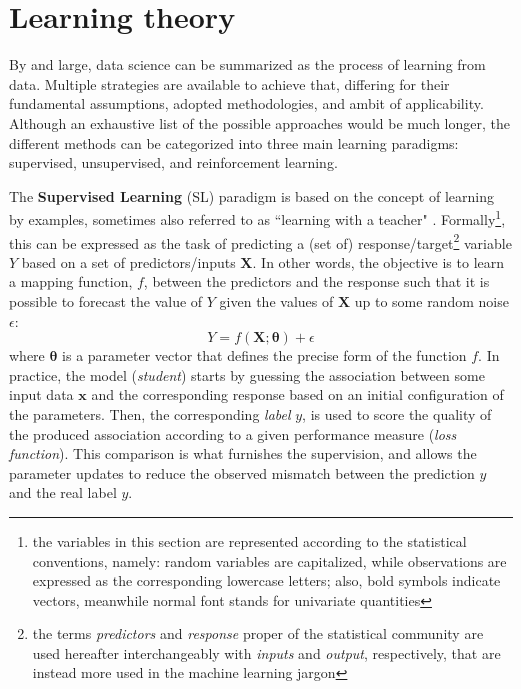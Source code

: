 \section{Learning theory}
\label{sec:learning}

By and large, data science can be summarized as the process of learning from data.
Multiple strategies are available to achieve that, differing for their fundamental assumptions, adopted methodologies, and ambit of applicability.
Although an exhaustive list of the possible approaches would be much longer, the different methods can be categorized into three main learning paradigms: supervised, unsupervised, and reinforcement learning.

The \textbf{Supervised Learning} (SL) paradigm is based on the concept of learning by examples, sometimes also referred to as ``learning with a teacher" \cite[Chapter 14]{friedman2009elements}.
Formally\footnote{\label{var_format} the variables in this section are represented according to the statistical conventions, namely: random variables are capitalized, while observations are expressed as the corresponding lowercase letters; also, bold symbols indicate vectors, meanwhile normal font stands for univariate quantities}, this can be expressed as the task of predicting a (set of) response/target\footnote{\label{var_naming} the terms \textit{predictors} and \textit{response} proper of the statistical community are used hereafter interchangeably with \textit{inputs} and \textit{output}, respectively, that are instead more used in the machine learning jargon} variable $Y$ based on a set of predictors/inputs $\boldsymbol X$.
In other words, the objective is to learn a mapping function, $f$, between the predictors and the response such that it is possible to forecast the value of $Y$ given the values of $\boldsymbol X$ up to some random noise $\epsilon$:
\begin{equation}
    Y = f \left(\boldsymbol X; \boldsymbol \theta \right) + \epsilon
\end{equation}
where $\boldsymbol \theta$ is a parameter vector that defines the precise form of the function $f$.
In practice, the model (\textit{student}) starts by guessing the association between some input data $\boldsymbol x$ and the corresponding response based on an initial configuration of the parameters. Then, the corresponding \textit{label} $y$, is used to score the quality of the produced association according to a given performance measure (\textit{loss function}).
This comparison is what furnishes the supervision, and allows the parameter updates to reduce the observed mismatch between the prediction $\hat{y}$ and the real label $y$.
